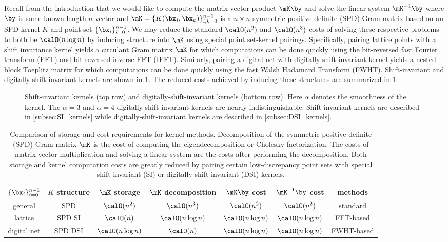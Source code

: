 \documentclass[acmsmall]{acmart}
\begin{document}
Recall from the introduction that we would like to compute the matrix-vector product $\mK \by$ and solve the linear system $\mK^{-1} \by$ where $\by$ is some known length $n$ vector and $\mK = \{K(\bx_i,\bx_k)\}_{i,k=0}^{n-1}$ is a $n \times n$ symmetric positive definite (SPD) Gram matrix based on an SPD kernel $K$ and point set $\{\bx_i\}_{i=0}^{n-1}$. We may reduce the standard $\calO(n^2)$ and $\calO(n^3)$ costs of solving these respective problems to both be $\calO(n \log n)$ by inducing structure into $\mK$ using special point set-kernel pairings. Specifically, pairing lattice points with a shift invariance kernel yields a circulant Gram matrix $\mK$ for which computations can be done quickly using the bit-reversed fast Fourier transform (FFT) and bit-reversed inverse FFT (IFFT). Similarly, pairing a digital net with digitally-shift-invariant kernel yields a nested block Toeplitz matrix for which computations can be done quickly using the fast Walsh Hadamard Transform (FWHT). Shift-invariant and digitally-shift-invariant kernels are shown in \cref{fig:SI_DSI_kernels}. The reduced costs achieved by inducing these structures are summarized in \cref{tab:com_kernel_costs}.

\begin{figure}%
    \centering
    \caption{Shift-invariant kernels (top row) and digitally-shift-invariant kernels (bottom row). Here $\alpha$ denotes the smoothness of the kernel. The $\alpha=3$ and $\alpha=4$ digitally-shift-invariant kernels are nearly indistinguishable. Shift-invariant kernels are described in \cref{subsec:SI_kernels} while digitally-shift-invariant kernels are described in \cref{subsec:DSI_kernels}.}
    \Description[]{}
    \label{fig:SI_DSI_kernels}
\end{figure}

\begin{table}[H]
    \centering
    \begin{tabular}{ccccccc} 
        $\{\bx_i\}_{i=0}^{n-1}$ & $K$ structure & $\mK$ storage & $\mK$ decomposition & $\mK \by$ cost & $\mK^{-1} \by$ cost & methods \\ 
        \hline 
        general & SPD & $\calO(n^2)$ & $\calO(n^3)$ & $\calO(n^2)$ & $\calO(n^2)$ & standard  \\
        lattice & SPD SI & $\calO(n)$ & $\calO(n \log n)$ & $\calO(n \log n)$ & $\calO(n \log n)$ & FFT-based \\ 
        digital net & SPD DSI & $\calO(n \log n)$ & $\calO(n)$ & $\calO(n \log n)$ & $\calO(n \log n)$ &FWHT-based
    \end{tabular}
    \caption{Comparison of storage and cost requirements for kernel methods. Decomposition of the symmetric positive definite (SPD) Gram matrix $\mK$ is the cost of computing the eigendecomposition or Cholesky factorization. The costs of matrix-vector multiplication and solving a linear system are the costs after performing the decomposition. Both storage and kernel computation costs are greatly reduced by pairing certain low-discrepancy point sets with special shift-invariant (SI) or digitally-shift-invariant (DSI) kernels.}
    \label{tab:com_kernel_costs}
\end{table}
\end{document}
